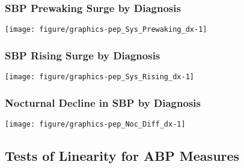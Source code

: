 \documentclass[10pt]{article}\usepackage[]{graphicx}\usepackage[]{color}
\makeatletter
\def\maxwidth{ %
  \ifdim\Gin@nat@width>\linewidth
    \linewidth
  \else
    \Gin@nat@width
  \fi
}
\newenvironment{knitrout}{}{} %
\makeatother
\begin{document}
\begin{landscape}
\subsubsection{SBP Prewaking Surge by Diagnosis}
\begin{knitrout}
\color{fgcolor}

{\centering \texttt{[image: figure/graphics-pep\_Sys\_Prewaking\_dx-1]} 

}



\end{knitrout}
\end{landscape}
\begin{landscape}
\subsubsection{SBP Rising Surge by Diagnosis}
\begin{knitrout}
\color{fgcolor}

{\centering \texttt{[image: figure/graphics-pep\_Sys\_Rising\_dx-1]} 

}



\end{knitrout}
\end{landscape}
\begin{landscape}
\subsubsection{Nocturnal Decline in SBP by Diagnosis}
\begin{knitrout}
\color{fgcolor}

{\centering \texttt{[image: figure/graphics-pep\_Noc\_Diff\_dx-1]} 

}



\end{knitrout}
\end{landscape}



\clearpage
\subsection{Tests of Linearity for ABP Measures}
\end{document}
